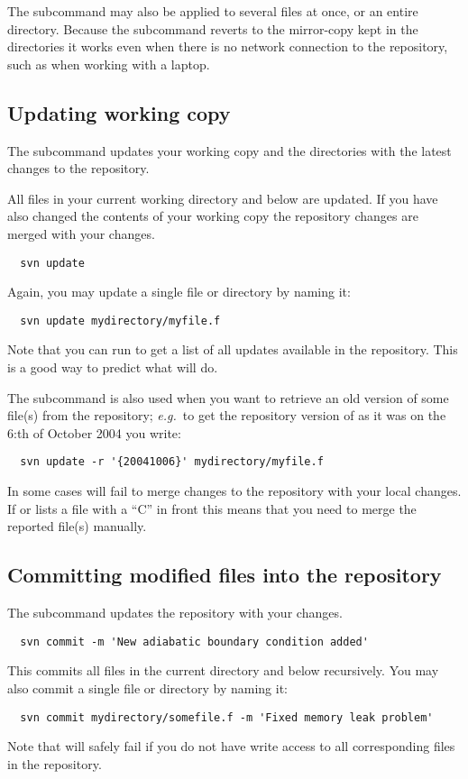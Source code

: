 \documentclass[10pt,a4paper]{simson}
\begin{document}
The  subcommand may also be applied to several files
at once, or an entire directory. Because the 
subcommand reverts to the mirror-copy kept in the 
directories it works even when there is no network connection to the
repository, such as when working with a laptop.


\subsection{Updating working copy}
The  subcommand updates your working copy and the
 directories with the latest changes to the repository.

All files in your current working directory and below are updated. If
you have also changed the contents of your working copy the repository
changes are merged with your changes.
\begin{verbatim}
  svn update
\end{verbatim}
Again, you may update a single file or directory by naming it:
\begin{verbatim}
  svn update mydirectory/myfile.f
\end{verbatim}
Note that you can run  to get a list of all
updates available in the repository. This is a good way to predict
what  will do.

The  subcommand is also used when you want to
retrieve an old version of some file(s) from the repository; \emph{e.g.}\ to
get the repository version of  as it was on the
6:th of October 2004 you write:
\begin{verbatim}
  svn update -r '{20041006}' mydirectory/myfile.f
\end{verbatim}
In some cases  will fail to merge changes to the
repository with your local changes. If  or
 lists a file with a ``C'' in front this means that
you need to merge the reported file(s) manually.


\subsection{Committing modified files into the repository}
The  subcommand updates the repository with your
changes.
\begin{verbatim}
  svn commit -m 'New adiabatic boundary condition added'
\end{verbatim}
This commits all files in the current directory and below
recursively. You may also commit a single file or directory by naming
it:
\begin{verbatim}
  svn commit mydirectory/somefile.f -m 'Fixed memory leak problem'
\end{verbatim}
Note that  will safely fail if you do not have
write access to all corresponding files in the repository.
\end{document}
